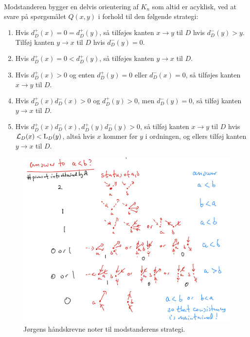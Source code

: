 Modstanderen bygger en delvis orientering af $K_{n}$ som altid er acyklisk, ved at svare på spørgsmålet $Q(x,y)$ i forhold til den følgende strategi:
\begin{enumerate}
	\item Hvis $d_{D}^{+}(x) = 0 = d_{D}^{+}(y)$, så tilføjes kanten $x \rightarrow y$ til $D$ hvis $d_{D}^{-}(y) > y$. Tilføj kanten $y \rightarrow x$ til $D$ hvis $d_{D}^{-}(y) = 0$.
	\item Hvis $d^{+}_{D}(x) = 0 < d^{+}_{D}(y)$, så tilføjes kanten $y \rightarrow x$ til $D$.
	\item Hvis $d^{+}_{D}(x) > 0$ og enten $d_{D}^{+}(y) = 0$ eller $d_{D}^{-}(x) = 0$, så tilføjes kanten $x \rightarrow y$ til $D$.
	\item Hvis $d^{+}_{D}(x) d_{D}^{-}(x) > 0$ og $d_{D}^{+}(y) > 0$, men $d_{D}^{-}(y) = 0$, så tilføj kanten $y \rightarrow x$ til $D$.
	\item Hvis $d_{D}^{+}(x)d^{-}_{D}(x), d^{+}_{D}(y)d_{D}^{-}(y) > 0$, så tilføj kanten $x \rightarrow y$ til $D$ hvis $\mathcal{L}_{D}(x) < \textsc{L}_{D}(y)$, altså hvis $x$ kommer før $y$ i ordningen, og ellers tilføj kanten $y \rightarrow x$ til $D$.
\end{enumerate}

\begin{figure}
	\centering
	\includegraphics[scale=0.25]{figur/adversarystrategynotes.png}
	\caption{\label{fig:joergenadversarystrategi} Jørgens håndskrevne noter til modstanderens strategi.}
\end{figure}


